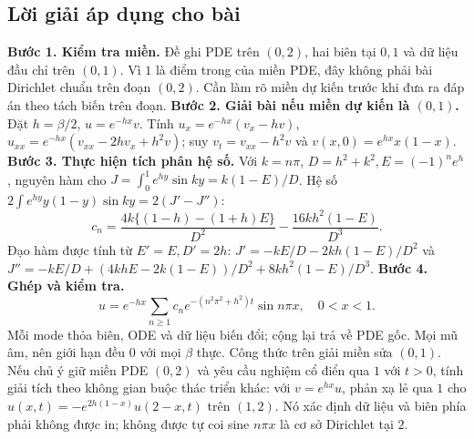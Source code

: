 \documentclass[10pt,a4paper]{article}
\begin{document}
\subsection*{Lời giải áp dụng cho bài}
\textbf{Bước 1. Kiểm tra miền.}
Đề ghi PDE trên $(0,2)$, hai biên tại $0,1$ và dữ liệu đầu chỉ trên $(0,1)$. Vì $1$ là điểm trong của miền PDE, đây không phải bài Dirichlet chuẩn trên đoạn $(0,2)$. Cần làm rõ miền dự kiến trước khi đưa ra đáp án theo tách biến trên đoạn.
\textbf{Bước 2. Giải bài nếu miền dự kiến là $(0,1)$.}
Đặt $h=\beta/2$, $u=e^{-hx}v$. Tính $u_x=e^{-hx}(v_x-hv)$, $u_{xx}=e^{-hx}(v_{xx}-2hv_x+h^2v)$; suy $v_t=v_{xx}-h^2v$ và $v(x,0)=e^{hx}x(1-x)$.
\textbf{Bước 3. Thực hiện tích phân hệ số.}
Với $k=n\pi$, $D=h^2+k^2,E=(-1)^ne^h$, nguyên hàm cho $J=\int_0^1e^{hy}\sin ky=k(1-E)/D$. Hệ số $2\int e^{hy}y(1-y)\sin ky=2(J'-J'')$:
\[c_n=\frac{4k\{(1-h)-(1+h)E\}}{D^2}
-\frac{16kh^2(1-E)}{D^3}.\]
Đạo hàm được tính từ $E'=E,D'=2h$: $J'=-kE/D-2kh(1-E)/D^2$ và $J''=-kE/D+(4khE-2k(1-E))/D^2+8kh^2(1-E)/D^3$.
\textbf{Bước 4. Ghép và kiểm tra.}
\[u=e^{-hx}\sum_{n\ge1}c_ne^{-(n^2\pi^2+h^2)t}\sin n\pi x,\quad0<x<1.\]
Mỗi mode thỏa biên, ODE và dữ liệu biến đổi; cộng lại trả về PDE gốc. Mọi mũ âm, nên giới hạn đều $0$ với mọi $\beta$ thực. Công thức trên giải miền sửa $(0,1)$. Nếu chủ ý giữ miền PDE $(0,2)$ và yêu cầu nghiệm cổ điển qua $1$ với $t>0$, tính giải tích theo không gian buộc thác triển khác: với $v=e^{hx}u$, phản xạ lẻ qua $1$ cho $u(x,t)=-e^{2h(1-x)}u(2-x,t)$ trên $(1,2)$. Nó xác định dữ liệu và biên phía phải không được in; không được tự coi sine $n\pi x$ là cơ sở Dirichlet tại $2$.
\end{document}
